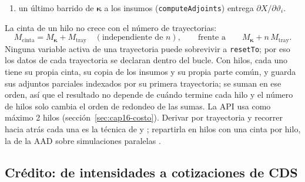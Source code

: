 \begin{sloppypar}
\begin{enumerate}
  \item un último barrido de $\boldsymbol\kappa$ a los insumos (\texttt{computeAdjoints}) entrega $\partial X/\partial\vartheta_i$.
\end{enumerate}
La cinta de un hilo no crece con el número de trayectorias:
\begin{equation}\label{eq:cap16-memoria}
  M_{\mathrm{cinta}}=M_{\boldsymbol\kappa}+M_{\mathrm{tray}}\quad(\text{independiente de }n),\qquad\text{frente a}\qquad
  M_{\boldsymbol\kappa}+n\,M_{\mathrm{tray}}.
\end{equation}
Ninguna variable activa de una trayectoria puede sobrevivir a \texttt{resetTo}; por eso los datos de cada
trayectoria se declaran dentro del bucle. Con hilos, cada uno tiene su propia cinta, su copia de los insumos y su
propia parte común, y guarda sus adjuntos parciales indexados por su primera trayectoria; se suman en ese orden, así
que el resultado no depende de cuándo termine cada hilo y el número de hilos solo cambia el orden de redondeo de las
sumas. La API usa como máximo 2 hilos (sección~\ref{sec:cap16-costo}). Derivar por trayectoria y recorrer hacia atrás cada una es la técnica de
\citet{giles2005} y \citet{capriotti2011}; repartirla en hilos con una cinta por hilo, la de la AAD sobre simulaciones
paralelas \citep{savine2018}.

\subsection{Crédito: de intensidades a cotizaciones de CDS}\label{sec:cap16-credito}


\end{sloppypar}
